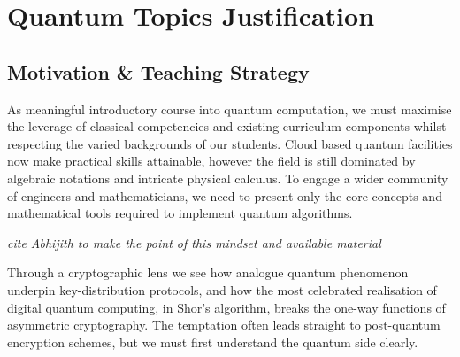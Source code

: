 \section{Quantum Topics Justification}

\subsection{Motivation \& Teaching Strategy}

As meaningful introductory course into quantum computation, we must maximise the leverage of 
 classical competencies and existing curriculum components whilst respecting the varied backgrounds of our students.  
Cloud based quantum facilities now make practical skills attainable, 
however the field is still dominated by algebraic notations and intricate physical calculus. 
To engage a wider community of engineers and mathematicians,
we need to present only the core concepts and mathematical tools required to implement quantum algorithms.

\emph{cite Abhijith to make the point of this mindset and available material}

Through a cryptographic lens we see how analogue quantum phenomenon underpin key-distribution protocols,
and how the most celebrated realisation of digital quantum computing, in Shor's algorithm, 
breaks the one-way functions of asymmetric cryptography.
The temptation often leads straight to post-quantum encryption schemes, 
but we must first understand the quantum side clearly.  



